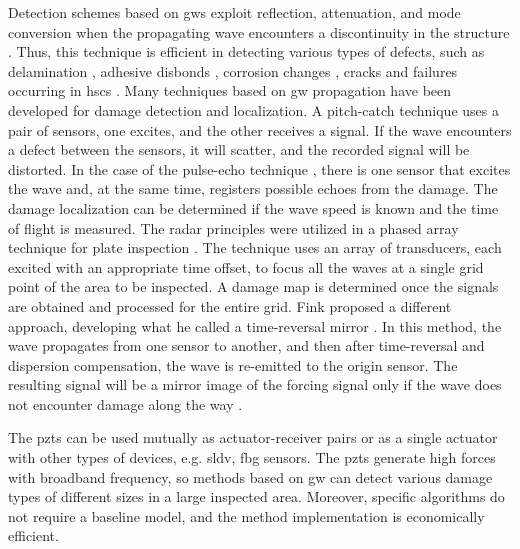 Detection schemes based on \acp{gw} exploit reflection, attenuation, and mode conversion when the propagating wave encounters a discontinuity in the structure \cite{alleyne1992interaction}.
Thus, this technique is efficient in detecting various types of defects, such as delamination \cite{sohn2011delamination,tian2015delamination}, adhesive disbonds \cite{rucka2018damage,balasubramaniam2021ultrasonic}, corrosion changes \cite{alleyne1995long,lowe1998defect}, cracks \cite{tua2004detection,lu2006crack,zima2020detection} and failures occurring in \acp{hsc} \cite{mustapha2011assessment, sikdar2016guided, sikdar2016ultrasonic,radzienski2016assessment, yu2019core}.
Many techniques based on \ac{gw} propagation have been developed for damage detection and localization.
A pitch-catch technique \cite{ihn2008pitch, sikdar2017structural} uses a pair of sensors, one excites, and the other receives a signal.
If the wave encounters a defect between the sensors, it will scatter, and the recorded signal will be distorted.
In the case of the pulse-echo technique \cite{guo1993interaction, kudela2008damage}, there is one sensor that excites the wave and, at the same time, registers possible echoes from the damage.
The damage localization can be determined if the wave speed is known and the time of flight is measured.
The radar principles were utilized in a phased array technique for plate inspection \cite{giurgiutiu2004embedded, ostachowicz2008elastic, kudela2018structural}.
The technique uses an array of transducers, each excited with an appropriate time offset, to focus all the waves at a single grid point of the area to be inspected.
A damage map is determined once the signals are obtained and processed for the entire grid.
Fink proposed a different approach, developing what he called a time-reversal mirror \cite{fink1992time}.
In this method, the wave propagates from one sensor to another, and then after time-reversal and dispersion compensation, the wave is re-emitted to the origin sensor.
The resulting signal will be a mirror image of the forcing signal only if the wave does not encounter damage along the way \cite{park2007time, eremin2016analytically}.

The \acp{pzt} can be used mutually as actuator-receiver pairs or as a single actuator with other types of devices, e.g. \ac{sldv}, \ac{fbg} sensors.
The \acp{pzt} generate high forces with broadband frequency, so methods based on \ac{gw} can detect various damage types of different sizes in a large inspected area.
Moreover, specific algorithms do not require a baseline model, and the method implementation is economically efficient.

